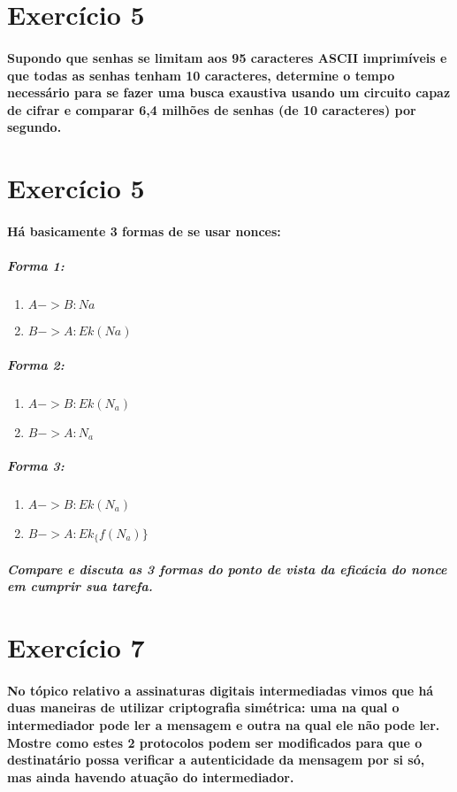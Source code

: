 \documentclass[10pt,a4paper]{report}
\begin{document}
\section*{Exercício 5}
\paragraph{ Supondo que senhas se limitam aos 95 caracteres ASCII imprimíveis e que todas as senhas tenham 10 caracteres, determine o tempo necessário para se fazer uma busca exaustiva usando um circuito capaz de cifrar e comparar 6,4 milhões de senhas (de 10 caracteres) por segundo.}
\section*{Exercício 5}
\paragraph{Há basicamente 3 formas de se usar nonces:}
\subparagraph{Forma 1:}
\begin{enumerate}[(1)]
\item $A -> B : Na$
\item $B -> A : Ek(Na)$
\end{enumerate}
\subparagraph{Forma 2:}
\begin{enumerate}[(1)]
\item $A -> B : Ek(N_a)$
\item $B -> A : N_a$
\end{enumerate}
\subparagraph{Forma 3:}
\begin{enumerate}[(1)]
\item $A -> B : Ek(N_a)$
\item $B -> A : Ek_\{f(N_a)\}$
\end{enumerate}
\subparagraph{Compare e discuta as 3 formas do ponto de vista da eficácia do nonce em cumprir sua tarefa.}
\section*{Exercício 7}
\paragraph{ No tópico relativo a assinaturas digitais intermediadas vimos que há duas maneiras de utilizar criptografia simétrica: uma na qual o intermediador pode ler a mensagem e outra na qual ele não pode ler. Mostre como estes 2 protocolos podem ser modificados para que o destinatário possa verificar a autenticidade da mensagem por si só, mas ainda havendo atuação do intermediador.}
\end{document}
